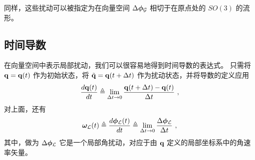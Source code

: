 同样，这些扰动可以被指定为在向量空间 $\Delta{\bm \phi}_{\mathcal{G}}$ 相切于在原点处的 $SO(3)$ 的流形。

\subsection{时间导数}

在向量空间中表示局部扰动，我们可以很容易地得到时间导数的表达式。 
只需将 ${\bf q}={\bf q}(t)$ 作为初始状态，将 $\tilde{{\bf q}}={\bf q}(t+\Delta t)$ 作为扰动状态，并将导数的定义应用
%
\begin{align}
\frac{d{\bf q}(t)}{dt} \triangleq \lim_{\Delta t\to0} \frac{{\bf q}(t+\Delta t)-{\bf q}(t)}{\Delta t}~, \label{equ:derivative}
\end{align}%
%
对上面，还有
%
\begin{align}
{\bm \omega}_{\mathcal{L}}(t) \triangleq \frac{d{\bm \phi}_{\mathcal{L}}(t)}{dt} \triangleq \lim_{\Delta t\to0} \frac{\Delta{\bm \phi}_{\mathcal{L}}}{\Delta t}~,
\end{align}%
%
其中，做为 $\Delta{\bm \phi}_{\mathcal{L}}$ 它是一个局部角扰动，对应于由 ${\bf q}$ 定义的局部坐标系中的角速率矢量。

